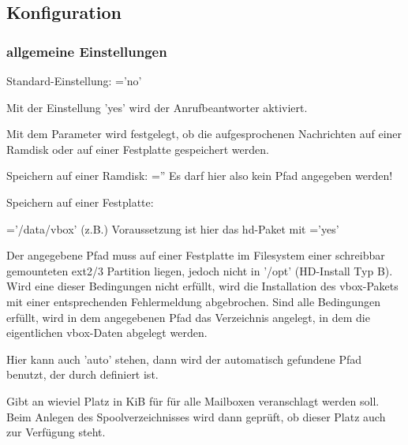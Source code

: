 \subsection{Konfiguration}
\subsubsection{allgemeine Einstellungen}
\begin{description}


        Standard-Einstellung: ='no'

        Mit der Einstellung 'yes' wird der Anrufbeantworter aktiviert.


    Mit dem Parameter  wird festgelegt, ob die aufgesprochenen Nachrichten 
    auf einer Ramdisk oder auf einer Festplatte gespeichert werden.

    Speichern auf einer Ramdisk:
    =''
    Es darf hier also kein Pfad angegeben werden!

    Speichern auf einer Festplatte:

    ='/data/vbox' (z.B.)
    Voraussetzung ist hier das hd-Paket mit ='yes'

    Der angegebene Pfad muss auf einer Festplatte im Filesystem einer 
    schreibbar gemounteten ext2/3 Partition liegen, jedoch nicht in '/opt' (HD-Install Typ B).
    Wird eine dieser Bedingungen nicht erfüllt, wird die Installation des vbox-Pakets 
    mit einer entsprechenden Fehlermeldung abgebrochen. Sind alle Bedingungen erfüllt, wird 
    in dem angegebenen Pfad das Verzeichnis  angelegt, in dem die eigentlichen 
    vbox-Daten abgelegt werden.

    Hier kann auch 'auto' stehen, dann wird der automatisch gefundene Pfad benutzt, der durch  definiert ist.

    
    Gibt an wieviel Platz in KiB für für alle Mailboxen veranschlagt werden soll. 
    Beim Anlegen des Spoolverzeichnisses wird dann geprüft, ob dieser Platz auch zur Verfügung steht.

    

\end{description}
